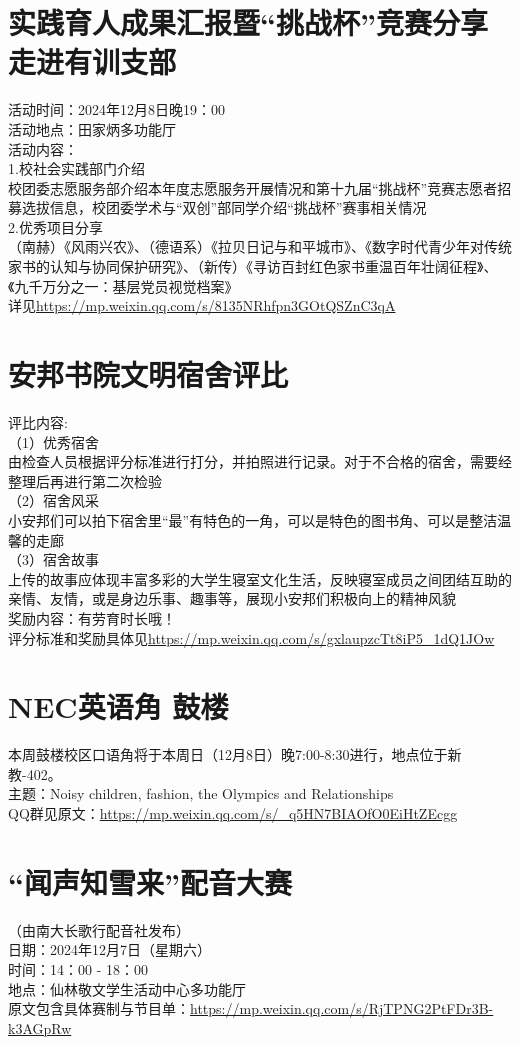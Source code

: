 \documentclass[letterpaper, 12pt]{article}
\begin{document}
\begin{multicols}{2}
\section{实践育人成果汇报暨“挑战杯”竞赛分享走进有训支部}
活动时间：2024年12月8日晚19：00\\
活动地点：田家炳多功能厅\\
活动内容：\\
1.校社会实践部门介绍\\
校团委志愿服务部介绍本年度志愿服务开展情况和第十九届“挑战杯”竞赛志愿者招募选拔信息，校团委学术与“双创”部同学介绍“挑战杯”赛事相关情况\\
2.优秀项目分享\\
（南赫）《风雨兴农》、（德语系）《拉贝日记与和平城市》、《数字时代青少年对传统家书的认知与协同保护研究》、（新传）《寻访百封红色家书重温百年壮阔征程》、《九千万分之一：基层党员视觉档案》\\
详见\url{https://mp.weixin.qq.com/s/8135NRhfpn3GOtQSZnC3qA}

\section{安邦书院文明宿舍评比}
评比内容:\\
（1）优秀宿舍\\
由检查人员根据评分标准进行打分，并拍照进行记录。对于不合格的宿舍，需要经整理后再进行第二次检验\\
（2）宿舍风采\\
小安邦们可以拍下宿舍里“最”有特色的一角，可以是特色的图书角、可以是整洁温馨的走廊\\
（3）宿舍故事\\
上传的故事应体现丰富多彩的大学生寝室文化生活，反映寝室成员之间团结互助的亲情、友情，或是身边乐事、趣事等，展现小安邦们积极向上的精神风貌\\
奖励内容：有劳育时长哦！\\
评分标准和奖励具体见\url{https://mp.weixin.qq.com/s/gxlaupzcTt8iP5_1dQ1JOw}

\section{NEC英语角 鼓楼}
本周鼓楼校区口语角将于本周日（12月8日）晚7:00-8:30进行，地点位于新教-402。\\
主题：Noisy children, fashion, the Olympics and Relationships\\
QQ群见原文：\url{https://mp.weixin.qq.com/s/_q5HN7BIAOfO0EiHtZEcgg}

\section{“闻声知雪来”配音大赛}
（由南大长歌行配音社发布）\\
日期：2024年12月7日（星期六）\\
时间：14：00 - 18：00\\
地点：仙林敬文学生活动中心多功能厅\\
原文包含具体赛制与节目单：\url{https://mp.weixin.qq.com/s/RjTPNG2PtFDr3B-k3AGpRw}


\end{multicols}
\end{document}
